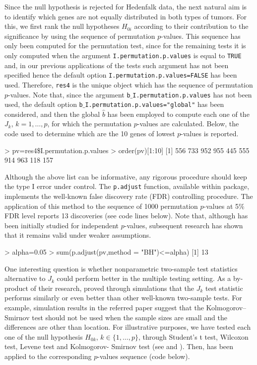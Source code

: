 Since the null hypothesis is rejected for Hedenfalk data, the next natural aim is to identify which genes are not equally distributed in both types of tumors. For this, we first rank
the null hypotheses $H_{0i}$ according to their contribution to the
significance by using the sequence of permutation $p$-values. This sequence has only been computed for the permutation test, since for the remaining tests it is only computed when the argument \texttt{I.permutation.p.values} is equal to \texttt{TRUE} and, in our previous applications of the tests such argument has not been specified hence the default option \texttt{I.permutation.p.values=FALSE} has been used. Therefore, \texttt{res4} is the unique object which has the sequence of permutation $p$-values. Note that, since the argument \texttt{b$\_$I.permutation.p.values} has not been used, the default option \texttt{b$\_$I.permutation.p.values="global"} has been considered, and then the global $\widehat{b}$ has been employed to compute each one of the $J_k$, $k=1, \dots, p$, for which the permutation $p$-values are calculated. Below, the code used to determine which are the 10 genes of lowest $p$-values is reported.

\begin{example}
	> pv=res4\$I.permutation.p.values
	> order(pv)[1:10]
	[1] 556 733 952 955 445 555 914 963 118 157
\end{example}


Although the above list can be informative, any rigorous procedure should keep the type I error under control. The \texttt{p.adjust} function, available within  package, implements the well-known \cite{BH} false discovery rate (FDR) controlling procedure. The application of this method to the sequence of 1000 permutation $p$-values at 5\% FDR level reports 13 discoveries (see code lines below). Note that, although \cite{BH} has been initially studied for independent $p$-values, subsequent research has shown that it remains valid under weaker assumptions.

\begin{example}
	> alpha=0.05
	> sum(p.adjust(pv,method = "BH")<=alpha)
	[1] 13
	
\end{example}



One interesting question is whether nonparametric two-sample test statistics alternative to $J_k$ could perform better in the multiple testing setting. As a by-product of their research, \cite{Marta3} proved through simulations  that the $J_k$ test statistic performs similarly or even better than other well-known two-sample tests. For example, simulation results in the referred paper suggest that the Kolmogorov–Smirnov test should not be used when the sample sizes are small and the
differences are other than location. For illustrative purposes, we have tested each one of the null hypothesis  $H_{0k}$, $k\in\{1,\ldots, p\}$, through 
Student's t test, Wilcoxon test, Levene test and Kolmogorov-
Smirnov test (see \citealp{Gi} and \citealp{le}). Then,
\cite{BH} has been applied to the corresponding $p$-values sequence (code below).


